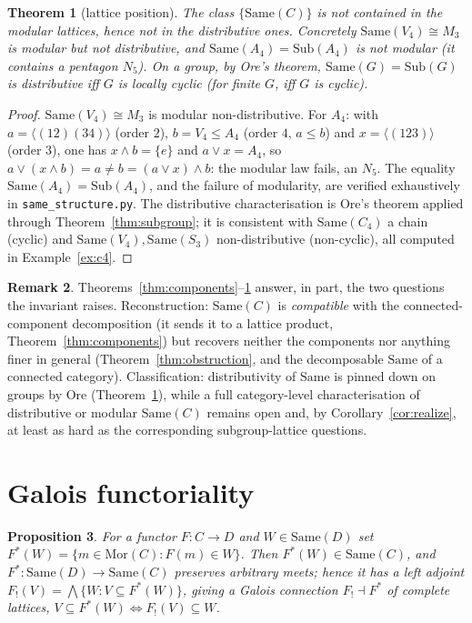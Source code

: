 \documentclass[11pt]{amsart}
\newtheorem{thm}{Theorem}[section]
\newtheorem{prop}[thm]{Proposition}
\theoremstyle{definition}
\newtheorem{rem}[thm]{Remark}
\newcommand{\Same}{\mathrm{Same}}
\newcommand{\Sub}{\mathrm{Sub}}
\newcommand{\Mor}{\mathrm{Mor}}
\newcommand{\Fstar}{F^{*}}
\newcommand{\Fshriek}{F_{!}}
\begin{document}
\begin{thm}[lattice position]\label{thm:position}
The class $\{\Same(C)\}$ is not contained in the modular lattices, hence not in
the distributive ones. Concretely $\Same(V_4)\cong M_3$ is modular but not
distributive, and $\Same(A_4)=\Sub(A_4)$ is not modular (it contains a pentagon
$N_5$). On a group, by Ore's theorem, $\Same(G)=\Sub(G)$ is distributive iff $G$
is locally cyclic (for finite $G$, iff $G$ is cyclic).
\end{thm}

\begin{proof}
$\Same(V_4)\cong M_3$ is modular non-distributive. For $A_4$: with
$a=\langle(12)(34)\rangle$ (order $2$), $b=V_4\le A_4$ (order $4$, $a\le b$) and
$x=\langle(123)\rangle$ (order $3$), one has $x\wedge b=\{e\}$ and $a\vee x=A_4$,
so $a\vee(x\wedge b)=a\neq b=(a\vee x)\wedge b$: the modular law fails, an $N_5$.
The equality $\Same(A_4)=\Sub(A_4)$, and the failure of modularity, are verified
exhaustively in \texttt{same\_structure.py}. The distributive characterisation is
Ore's theorem \cite{Ore} applied through Theorem~\ref{thm:subgroup}; it is
consistent with $\Same(C_4)$ a chain (cyclic) and $\Same(V_4),\Same(S_3)$
non-distributive (non-cyclic), all computed in Example~\ref{ex:c4}.
\end{proof}

\begin{rem}
Theorems~\ref{thm:components}--\ref{thm:position} answer, in part, the two
questions the invariant raises. Reconstruction: $\Same(C)$ is \emph{compatible}
with the connected-component decomposition (it sends it to a lattice product,
Theorem~\ref{thm:components}) but recovers neither the components nor anything
finer in general (Theorem~\ref{thm:obstruction}, and the decomposable
$\Same$ of a connected category). Classification: distributivity of $\Same$ is
pinned down on groups by Ore (Theorem~\ref{thm:position}), while a full
category-level characterisation of distributive or modular $\Same(C)$ remains
open and, by Corollary~\ref{cor:realize}, at least as hard as the corresponding
subgroup-lattice questions.
\end{rem}

\section{Galois functoriality}\label{sec:functorial}

\begin{prop}\label{prop:galois}
For a functor $F\colon C\to D$ and $W\in\Same(D)$ set
$\Fstar(W)=\{m\in\Mor(C):F(m)\in W\}$. Then $\Fstar(W)\in\Same(C)$, and
$\Fstar\colon\Same(D)\to\Same(C)$ preserves arbitrary meets; hence it has a left
adjoint $\Fshriek(V)=\bigwedge\{W:V\subseteq\Fstar(W)\}$, giving a Galois
connection $\Fshriek\dashv\Fstar$ of complete lattices,
$V\subseteq\Fstar(W)\Leftrightarrow\Fshriek(V)\subseteq W$.
\end{prop}
\end{document}

